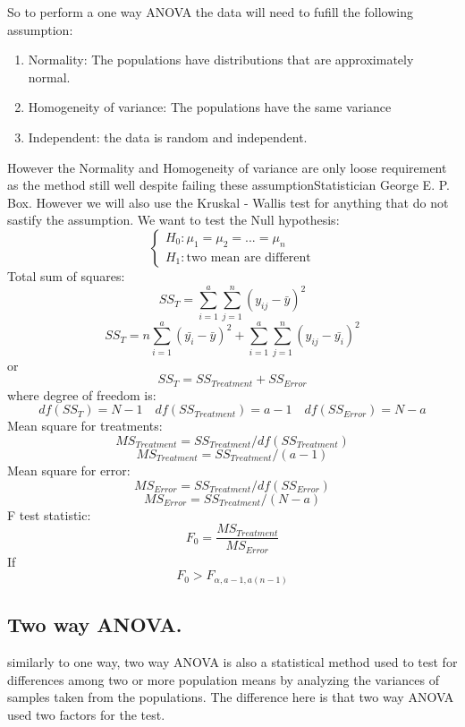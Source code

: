 So to perform a one way ANOVA the data will need to fufill the following assumption:
\begin{enumerate}
    \item Normality: The populations have distributions that are approximately normal.
    \item Homogeneity of variance: The populations have the same variance
    \item Independent: the data is random and independent.
\end{enumerate}
However the Normality and Homogeneity of variance are only loose requirement as the method still well despite failing these assumptionStatistician George E. P. Box.
However we will also use the Kruskal - Wallis test for anything that do not sastify the assumption.
We want to test the Null hypothesis:
\[
\begin{cases}
    H_0: \mu_1 = \mu_2 = ... = \mu_n \\
    H_1: \text{two mean are different}
\end{cases}
\]
Total sum of squares:
\[ SS_T = \sum_{i = 1}^{a} \sum_{j = 1}^{n} (y_{ij} - \bar{y})^2\]
\[ SS_T = n\sum_{i=1}^{a}(\bar{y_i}-\bar{y})^2 + \sum_{i=1}^{a}\sum_{j=1}^{n}(y_{ij}-\bar{y_i})^2\]
or
\[ SS_T = SS_{Treatment}+SS_{Error}\]
where degree of freedom is:
\[df(SS_T) = N - 1 \quad df(SS_{Treatment}) = a - 1 \quad df(SS_{Error}) = N - a \]
Mean square for treatments: 
\[MS_{Treatment} = SS_{Treatment} / df(SS_{Treatment})\]
\[MS_{Treatment} = SS_{Treatment} / (a - 1)\]
Mean square for error: 
\[MS_{Error} = SS_{Treatment} / df(SS_{Error})\]
\[MS_{Error} = SS_{Treatment} / (N - a)\]   
F test statistic: 
\[F_0 = \frac{MS_{Treatment}}{MS_{Error}}\]
If \[F_0 > F_{\alpha , a-1,a(n-1)}\]

\subsection{Two way ANOVA.}
similarly to one way, two way ANOVA is also a statistical method used to test for differences among two or more population means by analyzing the variances of samples taken from the populations. The difference here is that two way ANOVA used two factors for the test.

